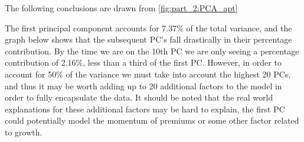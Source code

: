 The following conclusions are drawn from \autoref{fig:part_2:PCA_apt}

The first principal component accounts for 7.37\% of the total variance, and the graph below shows that the subsequent PC's fall drastically in their percentage contribution. By the time we are on the 10th PC we are only seeing a percentage contribution of 2.16\%, less than a third of the first PC. However, in order to account for 50\% of the variance we must take into account the highest 20 PCs, and thus it may be worth adding up to 20 additional factors to the model in order to fully encapsulate the data. It should be noted that the real world explanations for these additional factors may be hard to explain, the first PC could potentially model the momentum of premiums or some other factor related to growth.